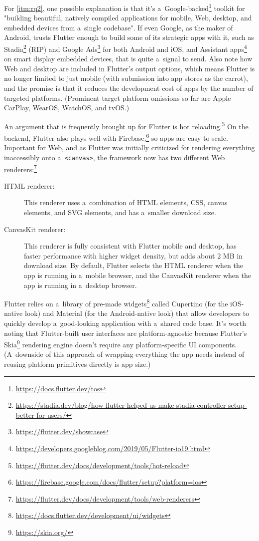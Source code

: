\documentclass[sigconf]{acmart}
\begin{document}
For \ref{itm:rq2}, one possible explanation is that it's a~Google-backed\footnote{\url{https://docs.flutter.dev/tos}} toolkit for "building beautiful, natively compiled applications for mobile, Web, desktop, and embedded devices from a~single codebase". If even Google, as the maker of Android, trusts Flutter enough to build some of its strategic apps with it, such as Stadia\footnote{\url{https://stadia.dev/blog/how-flutter-helped-us-make-stadia-controller-setup-better-for-users/}} (RIP) and Google Ads\footnote{\url{https://flutter.dev/showcase}} for both Android and iOS, and Assistant apps\footnote{\url{https://developers.googleblog.com/2019/05/Flutter-io19.html}} on smart display embedded devices, that is quite a~signal to send. Also note how Web and desktop are included in Flutter's output options, which means Flutter is no longer limited to just mobile (with submission into app stores as the carrot), and the promise is that it reduces the development cost of apps by the number of targeted platforms. (Prominent target platform omissions so far are Apple CarPlay, WearOS, WatchOS, and tvOS.)

An argument that is frequently brought up for Flutter is hot reloading.\footnote{\url{https://flutter.dev/docs/development/tools/hot-reload}} On the backend, Flutter also plays well with Firebase,\footnote{\url{https://firebase.google.com/docs/flutter/setup?platform=ios}} so apps are easy to scale. Important for Web, and as Flutter was initially criticized for rendering everything inaccessibly onto a~\texttt{<canvas>}, the framework now has two different Web renderers:\footnote{\url{https://flutter.dev/docs/development/tools/web-renderers}}

\begin{description}
    \item[HTML renderer:] This renderer uses a~combination of HTML elements, CSS, canvas elements, and SVG elements, and has a~smaller download size.
    \item[CanvasKit renderer:] This renderer is fully consistent with Flutter mobile and desktop, has faster performance with higher widget density, but adds about 2 MB in download size. By default, Flutter selects the HTML renderer when the app is running in a~mobile browser, and the CanvasKit renderer when the app is running in a~desktop browser.
\end{description}

Flutter relies on a~library of pre-made widgets\footnote{\url{https://docs.flutter.dev/development/ui/widgets}} called Cupertino (for the iOS-native look) and Material (for the Android-native look) that allow developers to quickly develop a~good-looking application with a~shared code base. It's worth noting that Flutter-built user interfaces are platform-agnostic because Flutter’s Skia\footnote{\url{https://skia.org/}} rendering engine doesn't require any platform-specific UI components. (A~downside of this approach of wrapping everything the app needs instead of reusing platform primitives directly is app size.)
\end{document}
